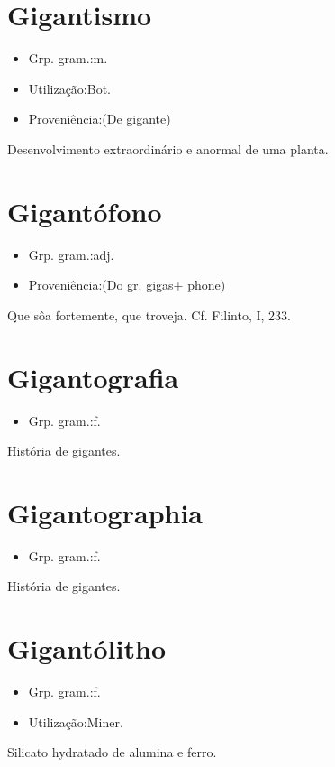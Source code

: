 \section{Gigantismo}
\begin{itemize}
\item {Grp. gram.:m.}
\end{itemize}
\begin{itemize}
\item {Utilização:Bot.}
\end{itemize}
\begin{itemize}
\item {Proveniência:(De \textunderscore gigante\textunderscore )}
\end{itemize}
Desenvolvimento extraordinário e anormal de uma planta.
\section{Gigantófono}
\begin{itemize}
\item {Grp. gram.:adj.}
\end{itemize}
\begin{itemize}
\item {Proveniência:(Do gr. \textunderscore gigas\textunderscore  + \textunderscore phone\textunderscore )}
\end{itemize}
Que sôa fortemente, que troveja. Cf. Filinto, I, 233.
\section{Gigantografia}
\begin{itemize}
\item {Grp. gram.:f.}
\end{itemize}
História de gigantes.
\section{Gigantographia}
\begin{itemize}
\item {Grp. gram.:f.}
\end{itemize}
História de gigantes.
\section{Gigantólitho}
\begin{itemize}
\item {Grp. gram.:f.}
\end{itemize}
\begin{itemize}
\item {Utilização:Miner.}
\end{itemize}
Silicato hydratado de alumina e ferro.
